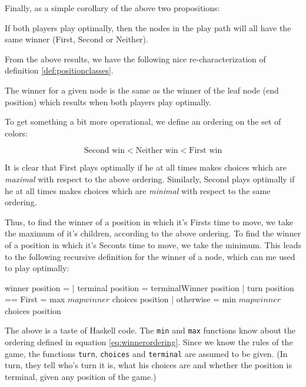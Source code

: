 Finally, as a simple corollary of the above two propositions:

\begin{proposition}
If both players play optimally, then the nodes in the play path will all have the same winner (First, Second or Neither).
\end{proposition}

From the above results, we have the following nice re-characterization of definition \ref{def:positionclasses}.

\begin{theorem}
The winner for a given node is the same as the winner of the leaf node (end position) which results when both players play optimally.
\end{theorem}

To get something a bit more operational, we define an ordering on the set of colors:

\begin{equation}
\label{eq:winnerordering}
  \text{Second win} < \text{Neither win} < \text{First win}
\end{equation}

It is clear that First plays optimally if he at all times makes choices which are \emph{maximal} with respect to the above ordering.
Similarly, Second plays optimally if he at all times makes choices which are \emph{minimal} with respect to the same ordering.

Thus, to find the winner of a position in which it's Firsts time to move, we take the maximum of it's children, according to the above ordering.
To find the winner of a position in which it's Seconts time to move, we take the minimum.
This leads to the following recursive definition for the winner of a node, which can me used to play optimally:

\begin{code}
  winner position =
    | terminal position       = terminalWinner position
    | turn position == First  = max $ map winner $ choices position
    | otherwise               = min $ map winner $ choices position
\end{code}


The above is a taste of Haskell code.
The \texttt{min} and \texttt{max} functions know about the ordering defined in equation \ref{eq:winnerordering}.
Since we know the rules of the game, the functions \texttt{turn}, \texttt{choices} and \texttt{terminal} are assumed to be given.
(In turn, they tell who's turn it is, what his choices are and whether the position is terminal, given any position of the game.)

